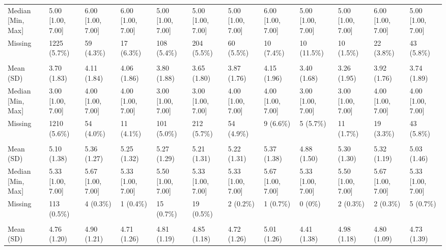 \documentclass[
  single column]{article}
\begin{document}
\begin{landscape}
\begin{tabular}[t]{llllllllllll}
\hspace{1em}Median [Min, Max] & 5.00 [1.00, 7.00] & 6.00 [1.00, 7.00] & 6.00 [1.00, 7.00] & 5.00 [1.00, 7.00] & 5.00 [1.00, 7.00] & 5.00 [1.00, 7.00] & 6.00 [1.00, 7.00] & 5.00 [1.00, 7.00] & 5.00 [1.00, 7.00] & 6.00 [1.00, 7.00] & 5.00 [1.00, 7.00]\\
\hspace{1em}Missing & 1225 (5.7\%) & 59 (4.3\%) & 17 (6.3\%) & 108 (5.4\%) & 204 (5.5\%) & 60 (5.5\%) & 10 (7.4\%) & 10 (11.5\%) & 10 (1.5\%) & 22 (3.8\%) & 43 (5.8\%)\\
\addlinespace[0.3em]
\multicolumn{12}{l}{\textbf{self\_control\_wish\_more\_reversed}}\\
\hspace{1em}Mean (SD) & 3.70 (1.83) & 4.11 (1.84) & 4.06 (1.86) & 3.80 (1.88) & 3.65 (1.80) & 3.87 (1.76) & 4.15 (1.96) & 3.40 (1.68) & 3.26 (1.95) & 3.92 (1.76) & 3.74 (1.89)\\
\hspace{1em}Median [Min, Max] & 3.00 [1.00, 7.00] & 4.00 [1.00, 7.00] & 4.00 [1.00, 7.00] & 3.00 [1.00, 7.00] & 3.00 [1.00, 7.00] & 4.00 [1.00, 7.00] & 4.00 [1.00, 7.00] & 3.00 [1.00, 7.00] & 3.00 [1.00, 7.00] & 4.00 [1.00, 7.00] & 4.00 [1.00, 7.00]\\
\hspace{1em}Missing & 1210 (5.6\%) & 54 (4.0\%) & 11 (4.1\%) & 101 (5.0\%) & 212 (5.7\%) & 54 (4.9\%) & 9 (6.6\%) & 5 (5.7\%) & 11 (1.7\%) & 19 (3.3\%) & 43 (5.8\%)\\
\addlinespace[0.3em]
\multicolumn{12}{l}{\textbf{self\_esteem}}\\
\hspace{1em}Mean (SD) & 5.10 (1.38) & 5.36 (1.27) & 5.25 (1.32) & 5.27 (1.29) & 5.21 (1.31) & 5.22 (1.31) & 5.37 (1.38) & 4.88 (1.50) & 5.30 (1.30) & 5.32 (1.19) & 5.03 (1.46)\\
\hspace{1em}Median [Min, Max] & 5.33 [1.00, 7.00] & 5.67 [1.00, 7.00] & 5.33 [1.00, 7.00] & 5.50 [1.00, 7.00] & 5.33 [1.00, 7.00] & 5.33 [1.00, 7.00] & 5.67 [1.00, 7.00] & 5.33 [1.00, 7.00] & 5.50 [1.00, 7.00] & 5.67 [1.00, 7.00] & 5.33 [1.00, 7.00]\\
\hspace{1em}Missing & 113 (0.5\%) & 4 (0.3\%) & 1 (0.4\%) & 15 (0.7\%) & 19 (0.5\%) & 2 (0.2\%) & 1 (0.7\%) & 0 (0\%) & 2 (0.3\%) & 2 (0.3\%) & 5 (0.7\%)\\
\addlinespace[0.3em]
\multicolumn{12}{l}{\textbf{short\_form\_health}}\\
\hspace{1em}Mean (SD) & 4.76 (1.20) & 4.90 (1.21) & 4.71 (1.26) & 4.81 (1.19) & 4.85 (1.18) & 4.72 (1.26) & 5.01 (1.26) & 4.41 (1.38) & 4.98 (1.18) & 4.80 (1.09) & 4.73 (1.39)\\

\end{tabular}
\end{landscape}
\end{document}
